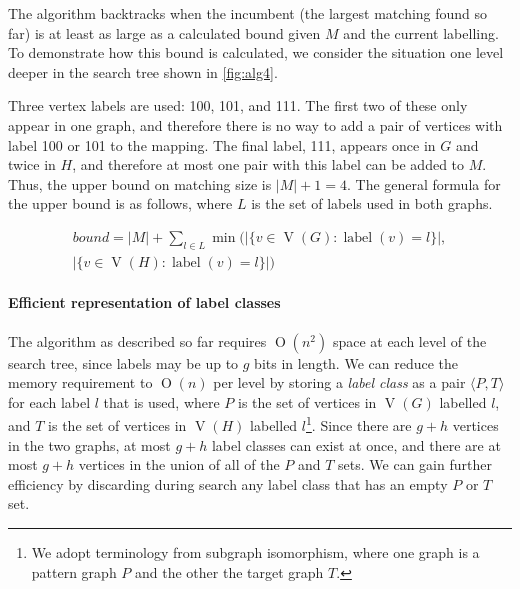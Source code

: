 \documentclass[letterpaper]{article}
\DeclareMathOperator{\V}{V}
\DeclareMathOperator{\vtxlabel}{label}
\newcommand{\BigO}[1]{\ensuremath{\operatorname{O}\left(#1\right)}}
\begin{document}
The algorithm backtracks when the incumbent (the largest matching found so far) is at least as large
as a calculated bound given $M$ and the current labelling. To demonstrate how
this bound is calculated, we consider the situation one level deeper in the
search tree shown in \cref{fig:alg4}.

Three vertex labels are used: 100,
101, and 111.  The first two of these only appear in one graph, and therefore
there is no way to add a pair of vertices with label 100 or 101 to the mapping.
The final label, 111, appears once in $G$ and twice in $H$, and therefore at
most one pair with this label can be added to $M$.  Thus, the upper bound on
matching size is $|M| + 1 = 4$. The general formula for the upper bound is
as follows, where $L$ is the set of labels used in both graphs.

\begin{multline*}
    \mathit{bound} = |M| + \sum_{l \in L} \min\big(|\{ v \in \V(G) : \vtxlabel(v)=l\}|, \\[-0.2cm]
        |\{ v \in \V(H) : \vtxlabel(v)=l \}|\big)
\end{multline*}



\paragraph{Efficient representation of label classes} The algorithm as
described so far requires $\BigO{n^2}$ space at each level of the search tree,
since labels may be up to $g$ bits in length. We can reduce the memory
requirement to $\BigO{n}$ per level by storing a \emph{label class} as a pair
$\langle P,T \rangle$ for each label $l$ that is used, where $P$ is the set of
vertices in $\V(G)$ labelled $l$, and $T$ is the set of vertices in $\V(H)$
labelled $l$\footnote{We adopt terminology from subgraph isomorphism, where one
graph is a pattern graph $P$ and the other the target graph $T$.}. Since there
are $g + h$ vertices in the two graphs, at most $g + h$ label classes
can exist at once, and there are at most $g + h$ vertices in the union of
all of the $P$ and $T$ sets.  We can gain further efficiency by discarding
during search any label class that has an empty $P$ or $T$ set.
\end{document}
